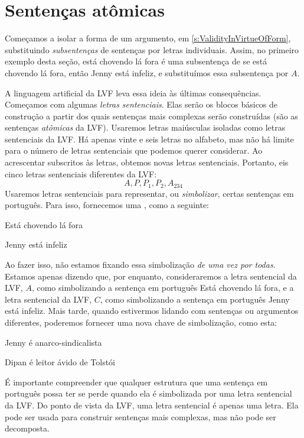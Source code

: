 \section{Sentenças atômicas}

Começamos a isolar a forma de um argumento, em
\cref{s:ValidityInVirtueOfForm}, substituindo \emph{subsentenças} de
sentenças por letras individuais. Assim, no primeiro exemplo desta seção,
está chovendo lá fora é uma subsentença de se está chovendo lá fora, então
Jenny está infeliz, e substituímos essa subsentença por $A$.

A linguagem artificial da LVF leva essa ideia às últimas consequências.
Começamos com algumas \emph{letras sentenciais}. Elas serão os blocos
básicos de construção a partir dos quais sentenças mais complexas serão
construídas (são as sentenças \emph{atômicas} da LVF). Usaremos letras
maiúsculas isoladas como letras sentenciais da LVF. Há apenas vinte e seis
letras no alfabeto, mas não há limite para o número de letras sentenciais
que podemos querer considerar. Ao acrescentar subscritos às letras,
obtemos novas letras sentenciais. Portanto, eis cinco letras sentenciais
diferentes da LVF:
	$$A, P, P_1, P_2, A_{234}$$
Usaremos letras sentenciais para representar, ou \emph{simbolizar},
certas sentenças em português. Para isso, fornecemos uma
, como a seguinte:
	\begin{ekey}
		\item[A] Está chovendo lá fora
		\item[C] Jenny está infeliz
	\end{ekey}
Ao fazer isso, não estamos fixando essa simbolização \emph{de uma vez
por todas}. Estamos apenas dizendo que, por enquanto, consideraremos a
letra sentencial da LVF, $A$, como simbolizando a sentença em português
Está chovendo lá fora, e a letra sentencial da LVF, $C$, como simbolizando
a sentença em português Jenny está infeliz. Mais tarde, quando estivermos
lidando com sentenças ou argumentos diferentes, poderemos fornecer uma
nova chave de simbolização, como esta:
	\begin{ekey}
		\item[A] Jenny é anarco-sindicalista
		\item[C] Dipan é leitor ávido de Tolstói
	\end{ekey}
É importante compreender que qualquer estrutura que uma sentença em
português possa ter se perde quando ela é simbolizada por uma letra
sentencial da LVF. Do ponto de vista da LVF, uma letra sentencial é apenas
uma letra. Ela pode ser usada para construir sentenças mais complexas,
mas não pode ser decomposta.

